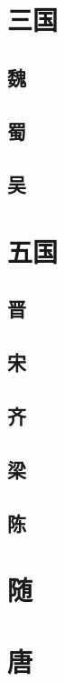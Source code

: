 \documentclass[UTF8,a4paper,8pt]{ctexbook}
\begin{document}
		
			
	\section{三国}
		\subsection{魏}
		
		
		\subsection{蜀}
		
		
		\subsection{吴}
		
		
		
	\section{五国}
		\subsection{晋}
		
		\subsection{宋}
		
		\subsection{齐}
		
		\subsection{梁}
		
		\subsection{陈}			
		
	\section{随}
	
	
	\section{唐}
		
\end{document}
